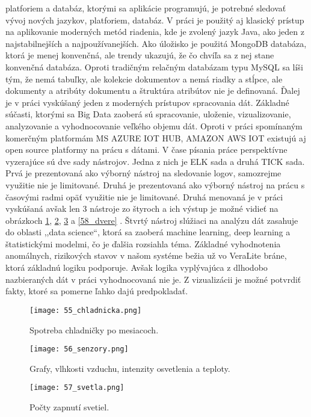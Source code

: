 platforiem a databáz, ktorými sa aplikácie programujú, je potrebné sledovať vývoj nových jazykov, platforiem, databáz. V práci je použitý aj klasický prístup na aplikovanie moderných metód riadenia, kde je zvolený jazyk Java, ako jeden z najstabilnejších a najpoužívanejších. Ako úložisko je použitá MongoDB databáza, ktorá je menej konvenčná, ale trendy ukazujú, že čo chvíľa sa z nej stane konvenčná  databáza. Oproti tradičným relačným databázam typu MySQL sa líši tým, že nemá tabuľky, ale kolekcie dokumentov a nemá riadky a stĺpce, ale dokumenty a atribúty dokumentu a štruktúra atribútov nie je definovaná. Ďalej je v práci vyskúšaný jeden z moderných prístupov spracovania dát. Základné súčasti, ktorými sa Big Data zaoberá sú spracovanie, uloženie, vizualizovanie, analyzovanie a vyhodnocovanie veľkého objemu dát. Oproti v práci spomínaným komerčným platformám MS AZURE IOT HUB, AMAZON AWS IOT existujú aj open source platformy na prácu s dátami. V čase písania práce perspektívne vyzerajúce sú dve sady nástrojov. Jedna z nich je ELK \cite{IOT34} sada a druhá TICK \cite{IOT33} sada. Prvá je prezentovaná ako výborný nástroj na sledovanie logov, samozrejme využitie nie je limitované. Druhá je prezentovaná ako výborný nástroj na prácu s časovými radmi opäť využitie nie je limitované. Druhá menovaná je v práci vyskúšaná avšak len 3 nástroje zo štyroch a ich výstup je možné vidieť na obrázkoch \ref{55_chladnicka}, \ref{56_senzory}, \ref{57_svetla} a \ref{58_dvere} . Štvrtý nástroj slúžiaci na analýzu dát zasahuje do oblasti ,,data science``, ktorá sa zaoberá machine learning, deep learning a štatistickými modelmi, čo je ďalšia rozsiahla téma. Základné vyhodnotenia anomálnych, rizikových stavov v našom systéme bežia už vo VeraLite bráne, ktorá základnú logiku podporuje. Avšak logika vyplývajúca z dlhodobo nazbieraných dát v práci vyhodnocovaná nie je. Z vizualizácii je možné potvrdiť fakty, ktoré sa pomerne ľahko dajú predpokladať.

\begin{figure}[!htbp]
\centering
\texttt{[image: 55\_chladnicka.png]}
\caption{Spotreba chladničky po mesiacoch.}
\label{55_chladnicka}
\end{figure}

\begin{figure}[!htbp]
\centering
\texttt{[image: 56\_senzory.png]}
\caption{Grafy, vlhkosti vzduchu, intenzity osvetlenia a teploty.}
\label{56_senzory}
\end{figure}

\begin{figure}[!htbp]
\centering
\texttt{[image: 57\_svetla.png]}
\caption{Počty zapnutí svetiel.}
\label{57_svetla}
\end{figure}

